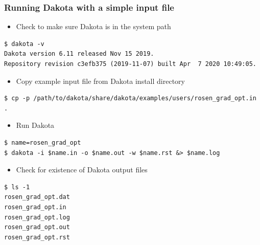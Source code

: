 \documentclass[t]{beamer}
\begin{document}
\begin{frame}[fragile]
  \frametitle{Running Dakota with a simple input file}
  \begin{itemize}
    \item Check to make sure Dakota is in the system path
  \end{itemize}
  \begin{tiny}\begin{lstlisting}
$ dakota -v
Dakota version 6.11 released Nov 15 2019.
Repository revision c3efb375 (2019-11-07) built Apr  7 2020 10:49:05.\end{lstlisting}\end{tiny}
  \begin{itemize}
    \item Copy example input file from Dakota install directory
  \end{itemize}
  \begin{tiny}\begin{lstlisting}
$ cp -p /path/to/dakota/share/dakota/examples/users/rosen_grad_opt.in .\end{lstlisting}\end{tiny}
  \begin{itemize}
    \item Run Dakota
  \end{itemize}
  \begin{tiny}\begin{lstlisting}
$ name=rosen_grad_opt
$ dakota -i $name.in -o $name.out -w $name.rst &> $name.log\end{lstlisting}\end{tiny}
  \begin{itemize}
    \item Check for existence of Dakota output files
  \end{itemize}
  \begin{tiny}\begin{lstlisting}
$ ls -1
rosen_grad_opt.dat
rosen_grad_opt.in
rosen_grad_opt.log
rosen_grad_opt.out
rosen_grad_opt.rst\end{lstlisting}\end{tiny}
\end{frame}

\end{document}
